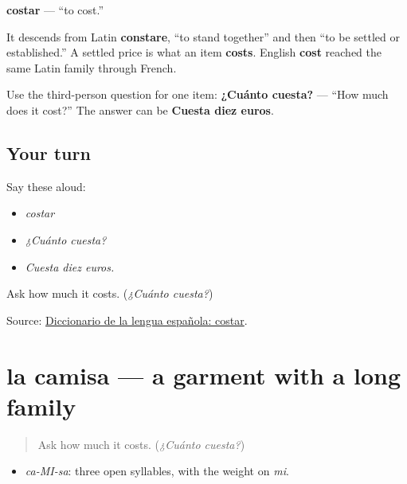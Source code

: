 \begin{cousinweb}
\textbf{costar} — \textquotedblleft{}to cost.\textquotedblright{}

It descends from Latin \textbf{constare}, \textquotedblleft{}to stand together\textquotedblright{} and then \textquotedblleft{}to be settled or established.\textquotedblright{} A settled price is what an item \textbf{costs}. English \textbf{cost} reached the same Latin family through French.

Use the third-person question for one item: \textbf{¿Cuánto cuesta?} — \textquotedblleft{}How much does it cost?\textquotedblright{} The answer can be \textbf{Cuesta diez euros}.
\end{cousinweb}

\subsection*{Your turn}
Say these aloud:

\begin{itemize}
\raggedright
  \item \emph{costar}
  \item \emph{¿Cuánto cuesta?}
  \item \emph{Cuesta diez euros.}
\end{itemize}

\begin{tcolorbox}[breakable,colback=teal!4,colframe=teal!35!black,title={Before you move on}]
Ask how much it costs. (\emph{¿Cuánto cuesta?})

Source: \href{https://dle.rae.es/costar}{Diccionario de la lengua española: costar}.
\end{tcolorbox}
\section[la camisa]{la camisa — a garment with a long family}

\label{lesson:ES-C402-camisa}



\begin{quote}
Ask how much it costs. (\emph{¿Cuánto cuesta?})
\end{quote}

\begin{sounds}
\begin{itemize}
\raggedright
  \item \emph{ca-MI-sa}: three open syllables, with the weight on \emph{mi}.
\end{itemize}
\end{sounds}

